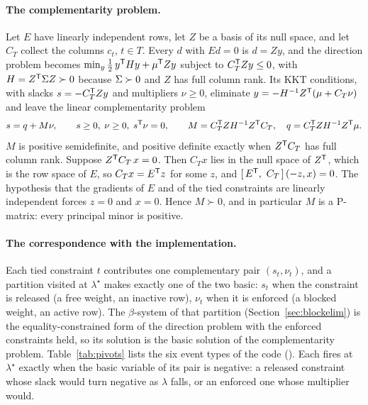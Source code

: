 \paragraph{The complementarity problem.}
Let $E$ have linearly independent rows, let $Z$ be a basis of its null space, and let
$C_T$ collect the columns $c_t$, $t \in T$. Every $d$ with $Ed = 0$ is $d = Zy$, and the
direction problem becomes $\min_y \tfrac12\, y^{\mathsf{T}} H y + \mu^{\mathsf{T}} Z y$ subject to
$C_T^{\mathsf{T}} Z y \le 0$, with $H = Z^{\mathsf{T}} \Sigma Z \succ 0$ because $\Sigma \succ 0$ and $Z$
has full column rank. Its KKT conditions, with slacks $s = -C_T^{\mathsf{T}} Z y$ and
multipliers $\nu \ge 0$, eliminate $y = -H^{-1} Z^{\mathsf{T}}(\mu + C_T \nu)$ and leave the
linear complementarity problem
\[
s = q + M\nu, \qquad s \ge 0,\; \nu \ge 0,\; s^{\mathsf{T}}\nu = 0, \qquad
M = C_T^{\mathsf{T}} Z H^{-1} Z^{\mathsf{T}} C_T,\quad q = C_T^{\mathsf{T}} Z H^{-1} Z^{\mathsf{T}} \mu .
\]
$M$ is positive semidefinite, and positive definite exactly when $Z^{\mathsf{T}} C_T$ has full
column rank. Suppose $Z^{\mathsf{T}} C_T\, x = 0$. Then $C_T x$ lies in the null space of
$Z^{\mathsf{T}}$, which is the row space of $E$, so $C_T x = E^{\mathsf{T}} z$ for some $z$, and
$[\,E^{\mathsf{T}},\ C_T\,]\,(-z, x) = 0$. The hypothesis that the gradients of $E$ and of the
tied constraints are linearly independent forces $z = 0$ and $x = 0$. Hence $M \succ 0$,
and in particular $M$ is a P-matrix: every principal minor is positive.

\paragraph{The correspondence with the implementation.}
Each tied constraint $t$ contributes one complementary pair $(s_t, \nu_t)$, and a
partition visited at $\lambda^{\star}$ makes exactly one of the two basic: $s_t$ when the
constraint is released (a free weight, an inactive row), $\nu_t$ when it is enforced (a
blocked weight, an active row). The $\beta$-system of that partition
(Section~\ref{sec:blockelim}) is the equality-constrained form of the direction problem with
the enforced constraints held, so its solution is the basic solution of the
complementarity problem. Table~\ref{tab:pivots} lists the six event types of the code
(). Each fires at $\lambda^{\star}$ exactly
when the basic variable of its pair is negative: a released constraint whose slack would
turn negative as $\lambda$ falls, or an enforced one whose multiplier would.

